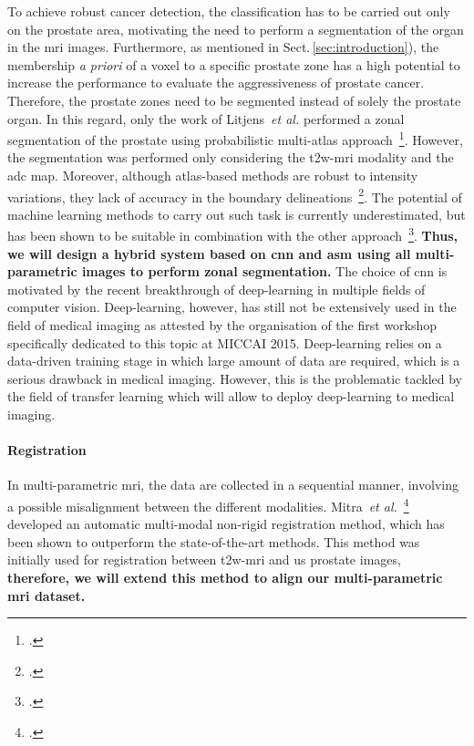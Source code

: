 To achieve robust cancer detection, the classification has to be carried out only on the prostate area, motivating the need to perform a segmentation of the organ in the \ac{mri} images.
Furthermore, as mentioned in Sect.\,\ref{sec:introduction}), the membership \emph{a priori} of a voxel to a specific prostate zone has a high potential to increase the performance to evaluate the aggressiveness of prostate cancer.
Therefore, the prostate zones need to be segmented instead of solely the prostate organ.
In this regard, only the work of Litjens~\emph{et al.} performed a zonal segmentation of the prostate using probabilistic multi-atlas approach~\footcite{Litjens2014}.
However, the segmentation was performed only considering the \ac{t2w}-\ac{mri} modality and the \ac{adc} map.
Moreover, although atlas-based methods are robust to intensity variations, they lack of accuracy in the boundary delineations~\footcite{Ghose2012}.
The potential of machine learning methods to carry out such task is currently underestimated, but has been shown to be suitable in combination with the other approach~\footcite{ghose2012graph}.
\textbf{Thus, we will design a hybrid system based on \ac{cnn} and \ac{asm} using all multi-parametric images to perform zonal segmentation.}
The choice of \ac{cnn} is motivated by the recent breakthrough of deep-learning in multiple fields of computer vision.
Deep-learning, however, has still not be extensively used in the field of medical imaging as attested by the organisation of the first workshop specifically dedicated to this topic at MICCAI 2015. 
Deep-learning relies on a data-driven training stage in which large amount of data are required, which is a serious drawback in medical imaging.
However, this is the problematic tackled by the field of transfer learning which will allow to deploy deep-learning to medical imaging.

\paragraph{Registration}

In multi-parametric \ac{mri}, the data are collected in a sequential manner, involving a possible misalignment between the different modalities.
Mitra~\emph{et al.}~\footcite{Mitra2012a} developed an automatic multi-modal non-rigid registration method, which has been shown to outperform the state-of-the-art methods.
This method was initially used for registration between \ac{t2w}-\ac{mri} and \ac{us} prostate images, \textbf{therefore, we will extend this method to align our multi-parametric \ac{mri} dataset.}


